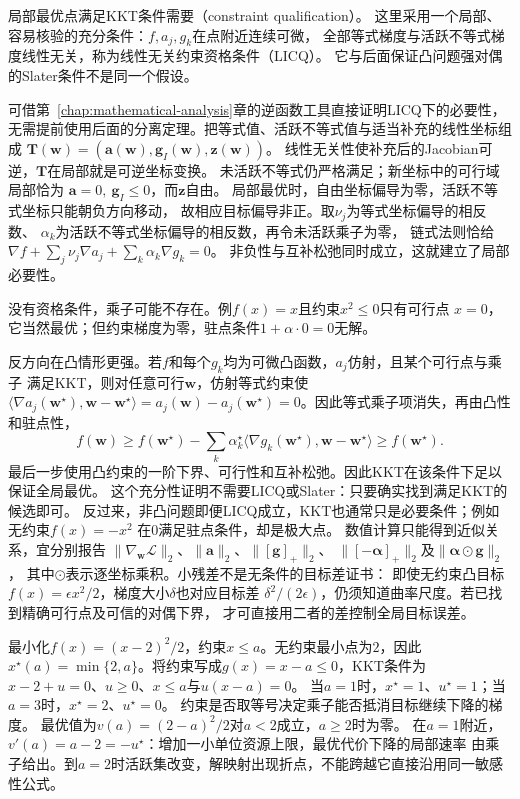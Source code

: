 局部最优点满足KKT条件需要（constraint qualification）。
这里采用一个局部、容易核验的充分条件：$f,a_j,g_k$在点附近连续可微，
全部等式梯度与活跃不等式梯度线性无关，称为线性无关约束资格条件（LICQ）。
它与后面保证凸问题强对偶的Slater条件不是同一个假设。

可借第~\ref{chap:mathematical-analysis}章的逆函数工具直接证明LICQ下的必要性，
无需提前使用后面的分离定理。把等式值、活跃不等式值与适当补充的线性坐标组成
$\bm T(\bm w)=(\bm a(\bm w),\bm g_I(\bm w),\bm z(\bm w))$。
线性无关性使补充后的Jacobian可逆，$\bm T$在局部就是可逆坐标变换。
未活跃不等式仍严格满足；新坐标中的可行域局部恰为
$\bm a=0,\ \bm g_I\leq0$，而$\bm z$自由。
局部最优时，自由坐标偏导为零，活跃不等式坐标只能朝负方向移动，
故相应目标偏导非正。取$\nu_j$为等式坐标偏导的相反数、
$\alpha_k$为活跃不等式坐标偏导的相反数，再令未活跃乘子为零，
链式法则恰给$\nabla f+\sum_j\nu_j\nabla a_j+\sum_k\alpha_k\nabla g_k=0$。
非负性与互补松弛同时成立，这就建立了局部必要性。

没有资格条件，乘子可能不存在。例$f(x)=x$且约束$x^2\leq0$只有可行点
$x=0$，它当然最优；但约束梯度为零，驻点条件$1+\alpha\cdot0=0$无解。

反方向在凸情形更强。若$f$和每个$g_k$均为可微凸函数，$a_j$仿射，且某个可行点与乘子
满足KKT，则对任意可行$\bm{w}$，仿射等式约束使
$\langle\nabla a_j(\bm{w}^{\star}),\bm{w}-\bm{w}^{\star}\rangle
=a_j(\bm{w})-a_j(\bm{w}^{\star})=0$。因此等式乘子项消失，再由凸性和驻点性，
\[
  f(\bm{w})\geq
  f(\bm{w}^{\star})
  -\sum_k\alpha_k^{\star}
  \langle\nabla g_k(\bm{w}^{\star}),\bm{w}-\bm{w}^{\star}\rangle
  \geq f(\bm{w}^{\star}).
\]
最后一步使用凸约束的一阶下界、可行性和互补松弛。因此KKT在该条件下足以保证全局最优。
这个充分性证明不需要LICQ或Slater：只要确实找到满足KKT的候选即可。
反过来，非凸问题即便LICQ成立，KKT也通常只是必要条件；例如无约束$f(x)=-x^2$
在$0$满足驻点条件，却是极大点。
数值计算只能得到近似关系，宜分别报告
$\|\nabla_{\bm w}\mathcal L\|_2$、$\|\bm a\|_2$、$\|[\bm g]_+\|_2$、
$\|[-\bm\alpha]_+\|_2$及$\|\bm\alpha\odot\bm g\|_2$，
其中$\odot$表示逐坐标乘积。小残差不是无条件的目标差证书：
即使无约束凸目标$f(x)=\epsilon x^2/2$，梯度大小$\delta$也对应目标差
$\delta^2/(2\epsilon)$，仍须知道曲率尺度。若已找到精确可行点及可信的对偶下界，
才可直接用二者的差控制全局目标误差。

\begin{example}[活跃约束与乘子]
\label{ex:opt-scalar-active-constraint}
最小化$f(x)=(x-2)^2/2$，约束$x\leq a$。无约束最小点为$2$，因此
$x^\star(a)=\min\{2,a\}$。将约束写成$g(x)=x-a\leq0$，KKT条件为
$x-2+u=0$、$u\geq0$、$x\leq a$与$u(x-a)=0$。
当$a=1$时，$x^\star=1$、$u^\star=1$；当$a=3$时，$x^\star=2$、$u^\star=0$。
约束是否取等号决定乘子能否抵消目标继续下降的梯度。
最优值为$v(a)=(2-a)^2/2$对$a<2$成立，$a\geq2$时为零。
在$a=1$附近，$v'(a)=a-2=-u^\star$：增加一小单位资源上限，最优代价下降的局部速率
由乘子给出。到$a=2$时活跃集改变，解映射出现折点，不能跨越它直接沿用同一敏感性公式。
\end{example}

